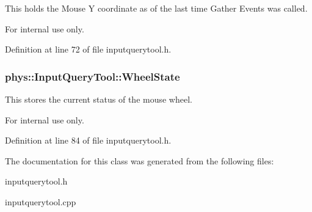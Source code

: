 This holds the Mouse Y coordinate as of the last time Gather Events was called. 

\begin{DoxyInternal}{For internal use only.}
\end{DoxyInternal}


Definition at line 72 of file inputquerytool.h.

\hypertarget{classphys_1_1InputQueryTool_af6ceb8ea79ea2fe4b881ce715090fa78}{
\subsubsection[{WheelState}]{ {\bf phys::InputQueryTool::WheelState}}}
\label{da/d96/classphys_1_1InputQueryTool_af6ceb8ea79ea2fe4b881ce715090fa78}


This stores the current status of the mouse wheel. 

\begin{DoxyInternal}{For internal use only.}
\end{DoxyInternal}


Definition at line 84 of file inputquerytool.h.



The documentation for this class was generated from the following files:\begin{DoxyCompactItemize}
\item 
inputquerytool.h\item 
inputquerytool.cpp\end{DoxyCompactItemize}
